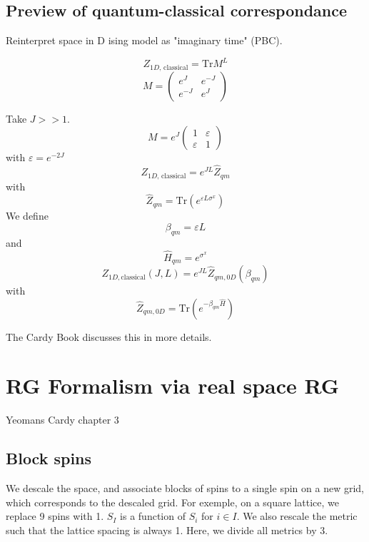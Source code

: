 \documentclass[a4paper]{book}
\theoremstyle{definition}
\theoremstyle{remark}
\begin{document}
\section{Preview of quantum-classical correspondance} 
Reinterpret space in D ising model as "imaginary time" (PBC). 

\begin{equation}
    Z_{1D\text{, classical}} = \text{Tr}M^L
\end{equation}
\begin{equation}
    M = \begin{pmatrix}
        e^J & e^{-J} \\ e^{-J} & e^J
    \end{pmatrix}
\end{equation}

Take $J>>1$. 
\begin{equation}
    M = e^J\begin{pmatrix}
        1 & \varepsilon \\ \varepsilon & 1
    \end{pmatrix}
\end{equation}
with $\varepsilon = e^{-2J}$
\begin{equation}
    Z_{1D\text{, classical}} = e^{JL}\hat{Z}_{qm}
\end{equation}
with 
\begin{equation}
    \hat{Z}_{qm} = \text{Tr}(e^{\varepsilon L \sigma^x})
\end{equation}
We define 
\begin{equation}
    \beta_{qm} = \varepsilon L
\end{equation}
and 
\begin{equation}
    \hat{H}_{qm}  = e^{\sigma^x}
\end{equation}
\begin{equation}
    Z_{1D, \text{classical}}(J, L) = e^{JL}\hat{Z}_{qm, 0D}(\beta_{qm})
\end{equation}
with 
\begin{equation}
    \hat{Z}_{qm, 0D} = \text{Tr}(e^{-\beta_{qm}\hat{H}})
\end{equation}

The Cardy Book discusses this in more details. 

\chapter{RG Formalism via real space RG}
Yeomans Cardy chapter 3 

\section{Block spins}
We descale the space, and associate blocks of spins to a single spin on a new grid, which corresponds to the descaled grid. For exemple, on a square lattice, we replace 9 spins with 1. $S_I$ is a function of $S_i$ for $i\in I$. We also rescale the metric such that the lattice spacing is always 1. Here, we divide all metrics by 3. 
\end{document}
